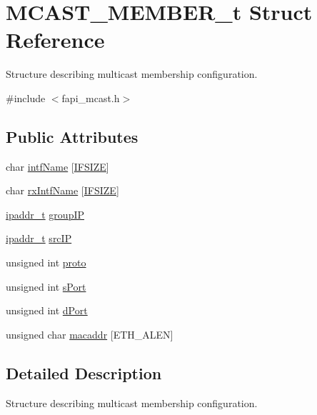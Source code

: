 \hypertarget{structMCAST__MEMBER__t}{\section{M\-C\-A\-S\-T\-\_\-\-M\-E\-M\-B\-E\-R\-\_\-t Struct Reference}
\label{structMCAST__MEMBER__t}
}


Structure describing multicast membership configuration.  




{\ttfamily \#include $<$fapi\-\_\-mcast.\-h$>$}

\subsection*{Public Attributes}
\begin{DoxyCompactItemize}
\item 
char \hyperlink{structMCAST__MEMBER__t_af64a5251fc8af6ac16052e9d8d97ae51}{intf\-Name} \mbox{[}\hyperlink{group__FAPI__MCAST_gaa55207000cd9168578be60cca21141e6}{I\-F\-S\-I\-Z\-E}\mbox{]}
\item 
char \hyperlink{structMCAST__MEMBER__t_ab0297b5fb862c50e7624b0df5162b4fa}{rx\-Intf\-Name} \mbox{[}\hyperlink{group__FAPI__MCAST_gaa55207000cd9168578be60cca21141e6}{I\-F\-S\-I\-Z\-E}\mbox{]}
\item 
\hyperlink{structipaddr__t}{ipaddr\-\_\-t} \hyperlink{structMCAST__MEMBER__t_abdec041f2d9705e2f9b3dfb0140040ad}{group\-I\-P}
\item 
\hyperlink{structipaddr__t}{ipaddr\-\_\-t} \hyperlink{structMCAST__MEMBER__t_a02d8c40017220d42cb82938036e7da3b}{src\-I\-P}
\item 
unsigned int \hyperlink{structMCAST__MEMBER__t_a451fba306b8ff40473c5927a05e299f6}{proto}
\item 
unsigned int \hyperlink{structMCAST__MEMBER__t_acaa4ac9a1eb240ab6c1328f754c3628d}{s\-Port}
\item 
unsigned int \hyperlink{structMCAST__MEMBER__t_a07ede5f961dc4deae13a5f799c6610ba}{d\-Port}
\item 
unsigned char \hyperlink{structMCAST__MEMBER__t_a4ce6350f2ca6f1b97c4d12cab85f3a71}{macaddr} \mbox{[}E\-T\-H\-\_\-\-A\-L\-E\-N\mbox{]}
\end{DoxyCompactItemize}


\subsection{Detailed Description}
Structure describing multicast membership configuration. 

